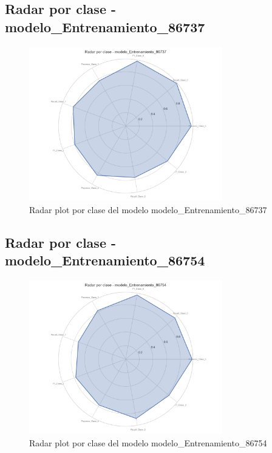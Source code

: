 \subsection{Radar por clase - modelo_Entrenamiento_86737}
\begin{figure}[H]
\centering
\includegraphics[width=0.75\textwidth]{Graficas/radar_modelo_Entrenamiento_86737.png}
\caption{Radar plot por clase del modelo modelo_Entrenamiento_86737}
\end{figure}

\subsection{Radar por clase - modelo_Entrenamiento_86754}
\begin{figure}[H]
\centering
\includegraphics[width=0.75\textwidth]{Graficas/radar_modelo_Entrenamiento_86754.png}
\caption{Radar plot por clase del modelo modelo_Entrenamiento_86754}
\end{figure}

